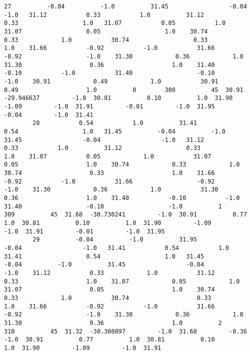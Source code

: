 \documentclass[11pt]{article}
\begin{document}
\begin{Verbatim}[commandchars=\\\{\}]
        27          -0.04          -1.0          31.45                 -0.04                 -1.0   31.12           0.33           1.0          31.12                  0.33                  1.0   31.07           0.05           1.0          31.07                  0.05                  1.0    30.74           0.33            1.0           30.74                  0.33                   1.0    31.66           -0.92           -1.0           31.66                  -0.92                  -1.0    31.30            0.36            1.0           31.30                   0.36                   1.0    31.40           -0.10           -1.0           31.40                  -0.10                  -1.0    30.91            0.49            1.0           30.91                   0.49                   1.0          0        308          45  30.91  -29.946637         -1.0  30.81          0.10          1.0  31.90         -1.09         -1.0  31.91         -0.01         -1.0  31.95         -0.04         -1.0  31.41   
        28           0.54           1.0          31.41                  0.54                  1.0   31.45          -0.04          -1.0          31.45                 -0.04                 -1.0   31.12           0.33           1.0          31.12                  0.33                  1.0    31.07           0.05            1.0           31.07                  0.05                   1.0    30.74            0.33            1.0           30.74                   0.33                   1.0    31.66           -0.92           -1.0           31.66                  -0.92                  -1.0    31.30            0.36            1.0           31.30                   0.36                   1.0    31.40           -0.10           -1.0           31.40                  -0.10                  -1.0          1        309          45  31.68  -30.730241         -1.0  30.91          0.77          1.0  30.81          0.10          1.0  31.90         -1.09         -1.0  31.91         -0.01         -1.0  31.95   
        29          -0.04          -1.0          31.95                 -0.04                 -1.0   31.41           0.54           1.0          31.41                  0.54                  1.0   31.45          -0.04          -1.0          31.45                 -0.04                 -1.0    31.12           0.33            1.0           31.12                  0.33                   1.0    31.07            0.05            1.0           31.07                   0.05                   1.0    30.74            0.33            1.0           30.74                   0.33                   1.0    31.66           -0.92           -1.0           31.66                  -0.92                  -1.0    31.30            0.36            1.0           31.30                   0.36                   1.0          2        310          45  31.32  -30.380897         -1.0  31.68         -0.36         -1.0  30.91          0.77          1.0  30.81          0.10          1.0  31.90         -1.09         -1.0  31.91   

\end{Verbatim}
\end{document}
